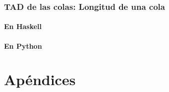\documentclass[a4paper,12pt,twoside]{book}
\begin{document}
\section{TAD de las colas: Longitud de una cola}
\subsection{En Haskell}
\subsection{En Python}

\part*{Apéndices}
\appendix

% 




\nocite{Allen-16a}
\nocite{Alonso-12a}
\nocite{Alonso-19a}
\nocite{Alonso-21a}
\nocite{Alonso-22a}
\nocite{Bird-10}
\nocite{Bird-14a}
\nocite{Bird-99a}
\nocite{Bird-Gibbons-20a}
\nocite{Casamayou-12a}
\nocite{Downey-02a}
\nocite{Goodrich-13data}
\nocite{Guttag-16introduction}
\nocite{Hall-10a}
\nocite{Hetland-11apython}
\nocite{Hudak-12a}
\nocite{Hunt-19a}
\nocite{Hunt-19b}
\nocite{Hutton-16a}
\nocite{Kurt-18a}
\nocite{Lipovača}
\nocite{Lott-18a}
\nocite{OSullivan-08a}
\nocite{Okasaki-19a}
\nocite{Padmanabhan-17a}
\nocite{Polya-65a}
\nocite{Rabhi-99a}
\nocite{Rubio-17a}
\nocite{Ruiz-04}
\nocite{Saha-15a}
\nocite{Sajanikar-17a}
\nocite{Sannella-22a}
\nocite{Serrano-14a}
\nocite{Shukla-14a}
\nocite{Stephenson-15a}
\nocite{Thompson-11a}
\nocite{vanHattem-22a}



\end{document}
